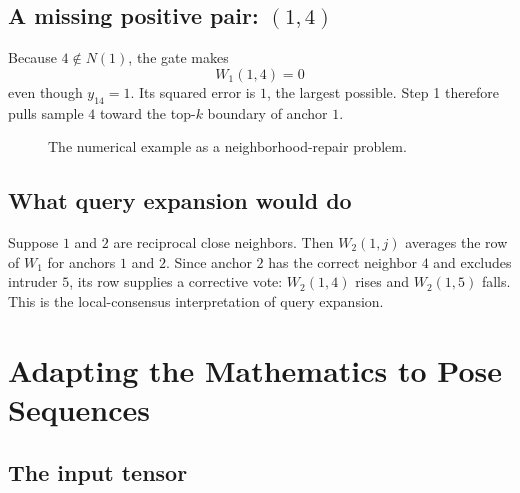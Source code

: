 \documentclass[11pt,oneside,openany]{book}
\theoremstyle{myplain}
\theoremstyle{definition}
\begin{document}
\section{A missing positive pair: $(1,4)$}

Because $4\notin N(1)$, the gate makes
\[
W_1(1,4)=0
\]
even though $y_{14}=1$. Its squared error is $1$, the largest possible. Step 1 therefore pulls sample $4$ toward the top-$k$ boundary of anchor $1$.

\begin{figure}[H]
\centering
{}
\caption{The numerical example as a neighborhood-repair problem.}
\label{fig:worked-example}
\end{figure}

\section{What query expansion would do}

Suppose $1$ and $2$ are reciprocal close neighbors. Then $W_2(1,j)$ averages the row of $W_1$ for anchors $1$ and $2$. Since anchor $2$ has the correct neighbor $4$ and excludes intruder $5$, its row supplies a corrective vote: $W_2(1,4)$ rises and $W_2(1,5)$ falls. This is the local-consensus interpretation of query expansion.

\chapter{Adapting the Mathematics to Pose Sequences}
\label{chap:pose}

\section{The input tensor}
\end{document}
